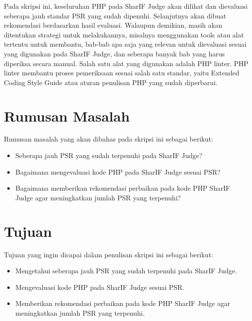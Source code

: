 \documentclass[a4paper,twoside]{article}
\begin{document}
Pada skripsi ini, keseluruhan PHP pada SharIF Judge akan dilihat dan dievaluasi seberapa jauh standar PSR yang sudah dipenuhi. Selanjutnya akan dibuat rekomendasi berdasarkan hasil evaluasi. Walaupun demikian, masih akan ditentukan strategi untuk melakukannya, misalnya menggunakan tools atau alat tertentu untuk membantu, bab-bab apa saja yang relevan untuk dievaluasi sesuai yang digunakan pada SharIF Judge, dan seberapa banyak bab yang harus diperiksa secara manual. Salah satu alat yang digunakan adalah PHP linter. PHP linter membantu proses pemeriksaan sesuai salah satu standar, yaitu Extended Coding Style Guide atau aturan penulisan PHP yang sudah diperbarui. 

\section{Rumusan Masalah}
Rumusan masalah yang akan dibahas pada skripsi ini sebagai berikut:
\begin{itemize}
	\item Seberapa jauh PSR yang sudah terpenuhi pada SharIF Judge?
	\item Bagaimana mengevaluasi kode PHP pada SharIF Judge sesuai PSR? 
	\item Bagaimana memberikan rekomendasi perbaikan pada kode PHP SharIF Judge agar meningkatkan jumlah PSR yang terpenuhi?
\end{itemize}

\section{Tujuan}
Tujuan yang ingin dicapai dalam penulisan skripsi ini sebagai berikut:
\begin{itemize}
	\item Mengetahui seberapa jauh PSR yang sudah terpenuhi pada SharIF Judge.
	\item Mengevaluasi kode PHP pada SharIF Judge sesuai PSR. 
	\item Memberikan rekomendasi perbaikan pada kode PHP SharIF Judge agar meningkatkan jumlah PSR yang terpenuhi.
\end{itemize}
\end{document}
